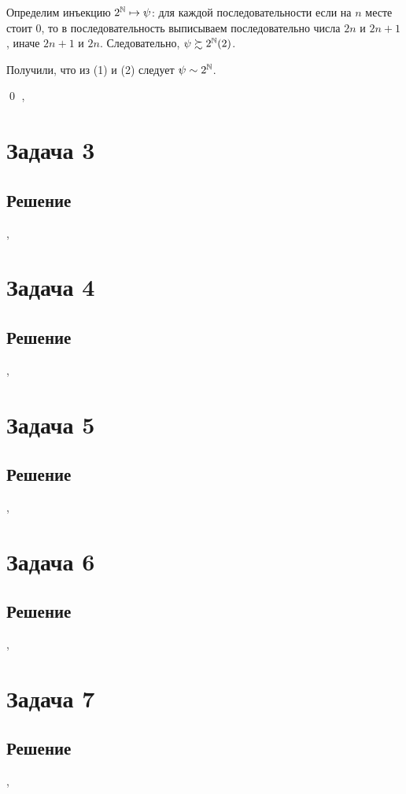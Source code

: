 \documentclass[a4paper,12pt]{article}
\begin{document}
	Определим инъекцию $2^{\mathbb{N}} \mapsto \psi$: для каждой последовательности если на $n$ месте стоит 0, то в последовательность выписываем последовательно числа $2n$ и $2n + 1$, иначе $2n + 1$ и $2n$. Следовательно, $\psi \succsim 2^{\mathbb{N}} (2)$.
	
	Получили, что из (1) и (2) следует $\psi \sim 2^{\mathbb{N}}$.
	
	
	\qed
	\sep
	\section*{Задача 3}
	
	
	\subsection*{Решение}
	
	
	\sep	
	
	\section*{Задача 4}

	\subsection*{Решение}


	\sep	
	
	\section*{Задача 5}
	
	\subsection*{Решение}
	
	

	\sep	
		
		
	\section*{Задача 6}

	
	\subsection*{Решение}
	


	\sep		
	
	
	
	
	\section*{Задача 7}

	
	\subsection*{Решение}
	


	\sep	
	
	
	
	
\end{document}
